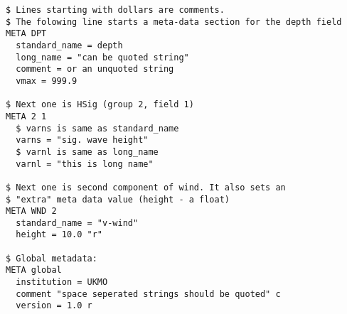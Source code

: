 \begin{verbatim}
$ Lines starting with dollars are comments.
$ The folowing line starts a meta-data section for the depth field
META DPT
  standard_name = depth
  long_name = "can be quoted string"
  comment = or an unquoted string
  vmax = 999.9

$ Next one is HSig (group 2, field 1)
META 2 1
  $ varns is same as standard_name
  varns = "sig. wave height"
  $ varnl is same as long_name
  varnl = "this is long name"

$ Next one is second component of wind. It also sets an
$ "extra" meta data value (height - a float)
META WND 2
  standard_name = "v-wind"
  height = 10.0 "r"

$ Global metadata:
META global
  institution = UKMO
  comment "space seperated strings should be quoted" c
  version = 1.0 r

\end{verbatim}

\pb
